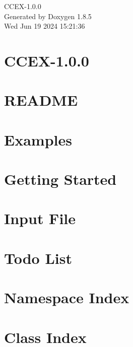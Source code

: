\documentclass[twoside]{book}
\newcommand{\clearemptydoublepage}{%
  \newpage{\pagestyle{empty}\cleardoublepage}%
}
\begin{document}
\hypersetup{pageanchor=false}
\begin{titlepage}
\vspace*{7cm}
\begin{center}%
{\Large C\-C\-E\-X-\/1.0.0 }\\
\vspace*{1cm}
{\large Generated by Doxygen 1.8.5}\\
\vspace*{0.5cm}
{\small Wed Jun 19 2024 15:21:36}\\
\end{center}
\end{titlepage}
\clearemptydoublepage
\tableofcontents
\clearemptydoublepage
{}
\hypersetup{pageanchor=true}

\chapter{C\-C\-E\-X-\/1.0.0}
\label{index}\hypertarget{index}{}
\chapter{R\-E\-A\-D\-M\-E}
\label{md__home_huijin_git_CCEX_README}
\hypertarget{md__home_huijin_git_CCEX_README}{}

\chapter{Examples}
\label{Examples}
\hypertarget{Examples}{}

\chapter{Getting Started}
\label{GettingStarted}
\hypertarget{GettingStarted}{}

\chapter{Input File}
\label{InputFile}
\hypertarget{InputFile}{}

\chapter{Todo List}
\label{todo}
\hypertarget{todo}{}

\chapter{Namespace Index}

\chapter{Class Index}

\end{document}

